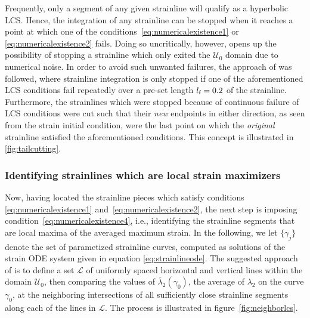 Frequently, only a segment of any given strainline will qualify as a hyperbolic
LCS\@. Hence, the integration of any strainline can be stopped when it reaches
a point at which one of the conditions~\eqref{eq:numericalexistence1} or
\eqref{eq:numericalexistence2} fails. Doing so uncritically, however, opens up
the possibility of stopping a strainline which only exited the $\mathcal{U}_{0}$
domain due to numerical noise. In order to avoid such unwanted failures,
the approach of \textcite{farazmand2012computing} was followed, where
strainline integration is only stopped if one of the aforementioned LCS
conditions fail repeatedly over a pre-set length $l_{\textnormal{f}}=0.2$ of
the strainline. Furthermore, the strainlines which were stopped because
of continuous failure of LCS conditions were cut such that their \emph{new}
endpoints in either direction, as seen from the strain initial condition, were
the last point on which the \emph{original} strainline satisfied the
aforementioned conditions. This concept is illustrated in
\cref{fig:tailcutting}.



\clearpage
\subsubsection{Identifying strainlines which are local strain maximizers}
\label{ssub:identifying_strainlines_which_are_local_strain_maximizers}

Now, having located the strainline pieces which satisfy conditions
\eqref{eq:numericalexistence1} and~\eqref{eq:numericalexistence2}, the next
step is imposing condition~\eqref{eq:numericalexistence4}, i.e., identifying the
strainline segments that are local maxima of the averaged maximum strain. In
the following, we let $\{\gamma_{j}\}$ denote the set of parametized strainline
curves, computed as solutions of the strain ODE system given in equation
\eqref{eq:strainlineode}. The suggested approach of
\textcite{farazmand2012computing} is to define a set $\mathcal{L}$ of uniformly
spaced horizontal and vertical lines within the domain $\mathcal{U}_{0}$, then
comparing the values of $\overline{\lambda}_{2}(\gamma_{0})$, the average of
$\lambda_{2}$ on the curve $\gamma_{0}$, at the neighboring intersections of all
sufficiently close strainline segments along each of the lines in
$\mathcal{L}$. The process is illustrated in figure~\ref{fig:neighborlcs}.



